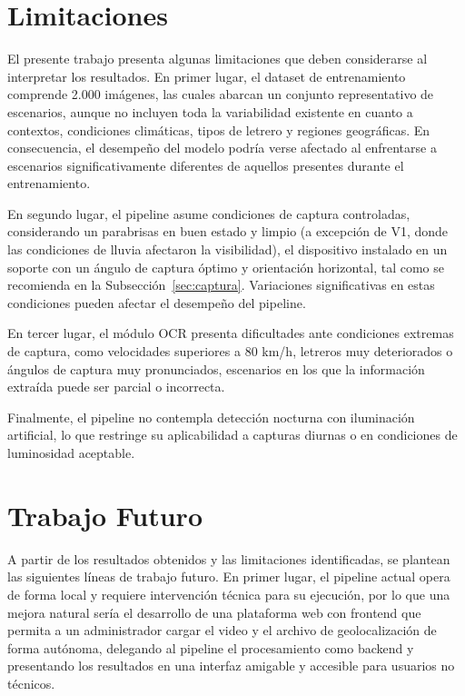 \documentclass[runningheads]{llncs}
\begin{document}
\section{Limitaciones}

El presente trabajo presenta algunas limitaciones que deben considerarse al
interpretar los resultados. En primer lugar, el dataset de entrenamiento
comprende 2.000 imágenes, las cuales abarcan un conjunto representativo de
escenarios, aunque no incluyen toda la variabilidad existente en cuanto a 
contextos, condiciones climáticas, tipos de letrero y regiones geográficas. 
En consecuencia, el desempeño del modelo podría verse afectado al enfrentarse
a escenarios significativamente diferentes de aquellos presentes durante el
entrenamiento.

En segundo lugar, el pipeline asume condiciones de captura controladas,
considerando un parabrisas en buen estado y limpio (a excepción de V1, donde 
las condiciones de lluvia afectaron la visibilidad), el dispositivo instalado
 en un soporte con un ángulo de captura óptimo y orientación horizontal, tal 
 como se recomienda en la Subsección~\ref{sec:captura}. Variaciones 
 significativas en estas condiciones pueden afectar el desempeño del pipeline.

En tercer lugar, el módulo OCR presenta dificultades ante condiciones extremas
de captura, como velocidades superiores a 80 km/h, letreros muy deteriorados
o ángulos de captura muy pronunciados, escenarios en los que la información
extraída puede ser parcial o incorrecta.

Finalmente, el pipeline no contempla detección nocturna con iluminación artificial, lo que restringe su aplicabilidad a capturas diurnas o en condiciones de luminosidad aceptable.


\section{Trabajo Futuro}

A partir de los resultados obtenidos y las limitaciones identificadas, 
se plantean las siguientes líneas de trabajo futuro. En primer lugar, 
el pipeline actual opera de forma local y requiere intervención 
técnica para su ejecución, por lo que una mejora natural sería el 
desarrollo de una plataforma web con frontend que permita a un 
administrador cargar el video y el archivo de geolocalización de 
forma autónoma, delegando al pipeline el procesamiento como backend y 
presentando los resultados en una interfaz amigable y accesible para 
usuarios no técnicos.
\end{document}
